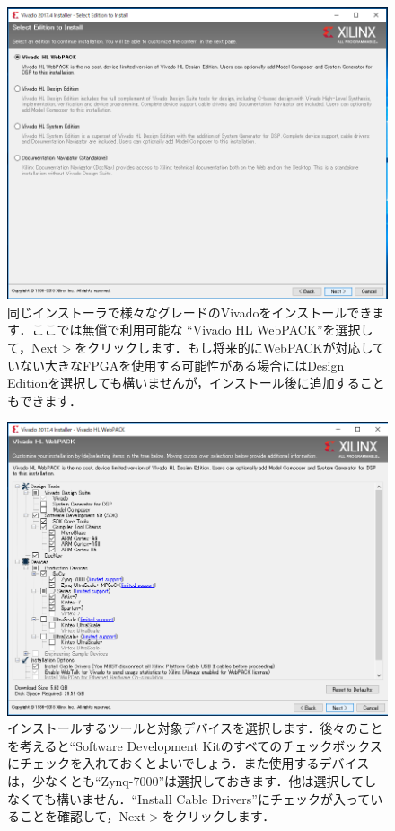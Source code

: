 \documentclass[a4paper,dvipdfmx]{jsarticle}
\begin{document}
 \begin{figure}[H]
  \begin{center}
   \includegraphics[width=.8\textwidth]{appendix_figures/11_installer_main.png}
  \end{center}
  \caption{同じインストーラで様々なグレードのVivadoをインストールできます．ここでは無償で利用可能な ``Vivado HL WebPACK''を選択して，Next$\gt$をクリックします．もし将来的にWebPACKが対応していない大きなFPGAを使用する可能性がある場合にはDesign Editionを選択しても構いませんが，インストール後に追加することもできます．}
 \end{figure}

 \begin{figure}[H]
  \begin{center}
   \includegraphics[width=.8\textwidth]{appendix_figures/12_installer_main.png}
  \end{center}
  \caption{インストールするツールと対象デバイスを選択します．後々のことを考えると``Software Development Kitのすべてのチェックボックスにチェックを入れておくとよいでしょう．また使用するデバイスは，少なくとも``Zynq-7000''は選択しておきます．他は選択してしなくても構いません．``Install Cable Drivers''にチェックが入っていることを確認して，Next$\gt$をクリックします．}
 \end{figure}
\end{document}
